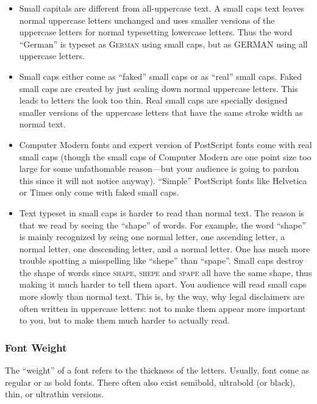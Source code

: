 \begin{itemize}
\item
  Small capitals are different from all-uppercase text. A small caps
  text leaves normal uppercase letters unchanged and uses smaller
  versions of the uppercase letters for normal typesetting lowercase
  letters. Thus the word ``German'' is typeset as \textsc{German}
  using small caps, but as \uppercase{German} using all uppercase
  letters.
\item
  Small caps either come as ``faked'' small caps or as ``real''
  small caps. Faked small caps are created by just scaling down
  normal uppercase letters. This leads to letters the look too
  thin. Real small caps are specially designed smaller versions of
  the uppercase letters that have the same stroke width as normal
  text.
\item
  Computer Modern fonts and expert version of PostScript fonts come
  with real small caps (though the small caps of Computer Modern are
  one point size too large for some unfathomable reason---but your
  audience is going to pardon this since it will not notice
  anyway). ``Simple'' PostScript fonts like Helvetica or Times only
  come with faked small caps.
\item
  Text typeset in small caps is harder to read than normal text. The
  reason is that we read by seeing the ``shape'' of words. For
  example, the word ``shape'' is mainly recognized by seing one
  normal letter, one ascending letter, a normal letter, one
  descending letter, and a normal letter. One has much more trouble
  spotting a misspelling like ``shepe''  than ``spape''. Small caps
  destroy the shape of words since \textsc{shape}, \textsc{shepe}
  and \textsc{spape} all have the same shape, thus making it much
  harder to tell them apart. You audience will read small caps more
  slowly than normal text. This is, by the way, why legal
  disclaimers are often written in uppercase letters: not to make
  them appear more important to you, but to make them much harder to
  actually read.
\end{itemize}



\subsubsection{Font Weight}

The ``weight'' of a font refers to the thickness of the
letters. Usually, font come as regular or as bold fonts. There often
also exist semibold, ultrabold (or black), thin, or ultrathin
versions.

